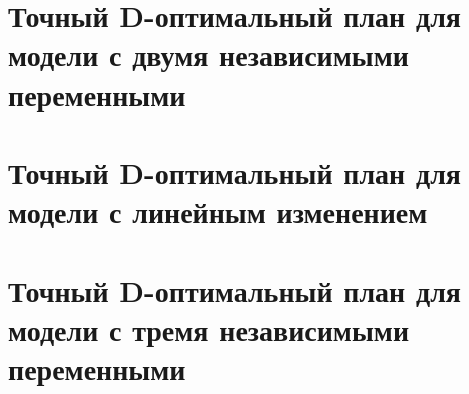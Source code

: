 \section{Точный D-оптимальный план для модели с двумя независимыми переменными}
\label{chapter2/diploma-section-2-1}


\section{Точный D-оптимальный план для модели с линейным изменением}


\section{Точный D-оптимальный план для модели с тремя независимыми переменными}


